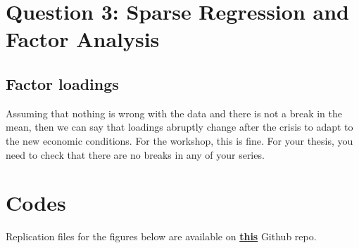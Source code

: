 \documentclass{article}
\begin{document}




\section{Question 3: Sparse Regression and Factor Analysis}

\subsection{Factor loadings}
Assuming that nothing is wrong with the data and there is not a break in the mean, then we can say that loadings abruptly change after the crisis to adapt to the new economic conditions.
For the workshop, this is fine. For your thesis, you need to check that there are no breaks in any of your series.


\clearpage
\appendix
\section{Codes}
Replication files for the figures below are available on \href{https://github.com/szlatanos/2021-10-29_TSW_Assignment}{\textbf{this}} Github repo.
\end{document}
